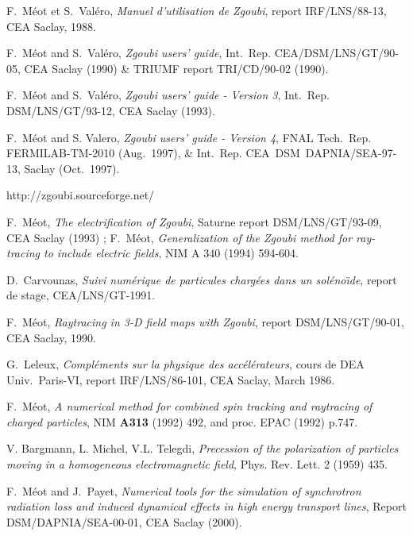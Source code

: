 \begin{thebibliography}{99}  %

 F.~M\'eot et S.~Val\'ero, \textsl{Manuel
d'utilisation de  Zgoubi}, report IRF/LNS/88-13, CEA Saclay, 1988.  

F.~M\'eot and S.~Val\'ero, \textsl{Zgoubi users' guide}, 
Int.~Rep. CEA/DSM/LNS/GT/90-05, CEA Saclay (1990) \& TRIUMF report TRI/CD/90-02 (1990). 

 F.~M\'eot and S.~Val\'ero, \textsl{Zgoubi users' guide - Version 3}, 
Int.~Rep. DSM/LNS/GT/93-12, CEA Saclay (1993). 

F.~M\'eot and S. Valero,  
\textsl{Zgoubi users' guide - Version 4}, 
FNAL Tech.~Rep. FERMILAB-TM-2010 (Aug.~1997),  \& 
Int.~Rep. CEA~DSM~DAPNIA/SEA-97-13, Saclay (Oct.~1997). 

 http://zgoubi.sourceforge.net/ 

 F.~M\'eot, \textsl{The electrification of Zgoubi}, 
Saturne report DSM/LNS/GT/93-09, CEA Saclay (1993) ; F.~M\'eot, \textsl{
Generalization of the Zgoubi method for ray-tracing to include electric 
fields}, NIM A 340 (1994) 594-604. 

 D.~Carvounas, \textsl{Suivi num\'erique de particules charg\'ees 
dans un sol\'eno\"\i de}, report de stage, CEA/LNS/GT-1991. 

 F.~M\'eot, \textsl{Raytracing in 3-D field maps with Zgoubi}, 
report  DSM/LNS/GT/90-01, CEA Saclay, 1990.

 G.~Leleux, \textsl{Compl\'ements sur la physique des acc\'el\'erateurs}, 
cours de DEA Univ.~Paris-VI,  report  IRF/LNS/86-101, CEA Saclay, March 1986. 

 F.~M\'eot, \textsl{A numerical method for combined spin tracking and 
raytracing of charged particles}, 
NIM \textbf{A313} (1992) 492, and proc. EPAC (1992) p.747. 

 V. Bargmann, L. Michel, V.L. Telegdi,
\textsl{Precession of the polarization of particles moving in a homogeneous electromagnetic field}, 
Phys. Rev. Lett. 2 (1959) 435.

 F.~M\'eot and J.~Payet, 
\textsl{Numerical tools for the simulation of synchrotron radiation  
loss and induced dynamical effects in high energy transport lines},  
Report DSM/DAPNIA/SEA-00-01, CEA Saclay (2000). 


\end{thebibliography}
